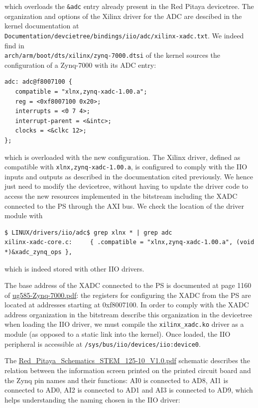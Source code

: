 \documentclass{article}
\begin{document}
{{which overloads the {\tt \&adc} entry already present in the Red Pitaya devicetree. The organization
and options of the Xilinx driver for the ADC are descibed in the kernel documentation at \\
{\tt Documentation/devcietree/bindings/iio/adc/xilinx-xadc.txt}. We indeed find in \\
{\tt arch/arm/boot/dts/xilinx/zynq-7000.dtsi} of the kernel sources the configuration of a Zynq-7000 with
its ADC entry:
\begin{verbatim}
adc: adc@f8007100 {
   compatible = "xlnx,zynq-xadc-1.00.a";
   reg = <0xf8007100 0x20>;
   interrupts = <0 7 4>;
   interrupt-parent = <&intc>;
   clocks = <&clkc 12>;
};
\end{verbatim}
which is overloaded with the new configuration. The Xilinx driver, defined as compatible with 
{\tt xlnx,zynq-xadc-1.00.a}, is configured to comply with the IIO inputs and outputs as described in the documentation 
cited previously. We hence just need to modify the devicetree, without having to update the driver code to access
the new resources implemented in the bitstream including the XADC connected to the PS through the AXI bus. We
check the location of the driver module with
\begin{verbatim}
$ LINUX/drivers/iio/adc$ grep xlnx * | grep adc
xilinx-xadc-core.c:     { .compatible = "xlnx,zynq-xadc-1.00.a", (void *)&xadc_zynq_ops },
\end{verbatim}
which is indeed stored with other IIO drivers.

The base address of the XADC connected to the PS is documented at page 1160 of \url{ug585-Zynq-7000.pdf}: the
registers for configuring the XADC from the PS are located at addresses starting at 0xf8007100. In order to
comply with the XADC address organization in the bitstream describe this organization in the devicetree when
loading the IIO driver, we must compile the {\tt xilinx\_xadc.ko} driver as a module (as opposed to a static
link into the kernel). 
Once loaded, the IIO peripheral is accessible at {\tt /sys/bus/iio/devices/iio:device0}.

The \url{Red_Pitaya_Schematics_STEM_125-10_V1.0.pdf} schematic describes the relation between the information
screen printed on the printed circuit board and the Zynq pin names and their functions: AI0 is connected to
AD8, AI1 is connected to AD0, AI2 is connected to AD1 and AI3 is connected to AD9, which helps understanding
the naming chosen in the IIO driver:

}}
\end{document}
